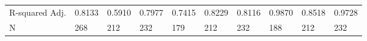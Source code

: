 \begin{table}
\begin{center}
\begin{tabular}{llllllllll}
R-squared Adj. & 0.8133        & 0.5910        & 0.7977        & 0.7415              & 0.8229              & 0.8116              & 0.9870             & 0.8518             & 0.9728              \\
N              & 268           & 212           & 232           & 179                 & 212                 & 232                 & 188                & 212                & 232                 \\
\hline
\end{tabular}
\end{center}
\end{table}